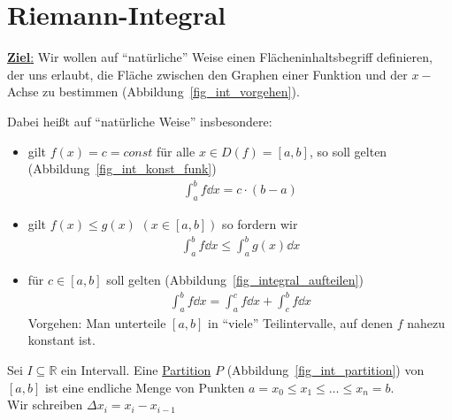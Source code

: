 \section{Riemann-Integral}\label{kap_riemann_integral}
\underline{\textbf{Ziel}:} Wir wollen auf \enquote{natürliche} Weise einen 
Flächeninhaltsbegriff definieren, der uns erlaubt, die Fläche zwischen den Graphen 
einer Funktion und der $x-$Achse zu bestimmen (Abbildung~\ref{fig_int_vorgehen}).
	
	
Dabei heißt auf \enquote{natürliche Weise} insbesondere: 
\begin{itemize}
	\item gilt $f(x) = c = const$ für alle $x \in D (f) = [a,b]$, so soll 
	gelten (Abbildung~\ref{fig_int_konst_funk})
	\begin{align*}
		\int_a^b f \dd{x} = c \cdot ( b - a)
	\end{align*}
	
	
	\item gilt $f(x) \leq g(x)$ $(x \in [a,b])$ so fordern wir
	\begin{align*}
		\int_a^b f \dd{x} \leq \int_a^b g(x) \dd{x} 
	\end{align*}
	
	\item für $c \in [a,b]$ soll gelten (Abbildung~\ref{fig_integral_aufteilen})
	\begin{align*}
		\int_a^b f \dd{x} = \int_a^c f \dd{x} + \int_c^b f\dd{x}
	\end{align*}
	Vorgehen: Man unterteile $[a,b]$ in \enquote{viele} Teilintervalle, auf denen 
	$f$ nahezu konstant ist.
	
\end{itemize} 

\begin{Definition}{
	Sei $ I \subseteq \mathbb{R}$ ein Intervall. Eine \underline{Partition} $P$ 
	(Abbildung~\ref{fig_int_partition}) von 
	$[a,b]$ ist eine endliche Menge von Punkten $a = x_0 \leq x_1 \leq \hdots
	\leq x_n = b$.\\
	Wir schreiben $\Delta x_i = x_i - x_{i-1}$
	
}\end{Definition}

